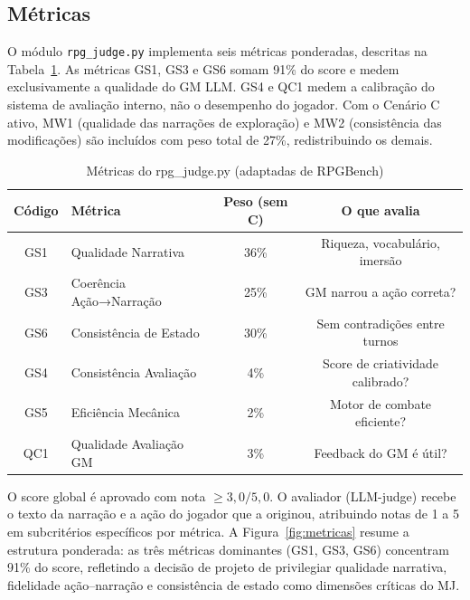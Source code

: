 \documentclass[12pt]{article}
\begin{document}
\subsection{Métricas}

O módulo \texttt{rpg\_judge.py} implementa seis métricas ponderadas, descritas na Tabela~\ref{tab:metricas}. As métricas GS1, GS3 e GS6 somam 91\% do score e medem exclusivamente a qualidade do GM LLM. GS4 e QC1 medem a calibração do sistema de avaliação interno, não o desempenho do jogador. Com o Cenário C ativo, MW1 (qualidade das narrações de exploração) e MW2 (consistência das modificações) são incluídos com peso total de 27\%, redistribuindo os demais.

\begin{table}[ht]
\centering
\caption{Métricas do rpg\_judge.py (adaptadas de RPGBench)}
\label{tab:metricas}
\begin{tabular}{clcc}
\toprule
\textbf{Código} & \textbf{Métrica} & \textbf{Peso (sem C)} & \textbf{O que avalia} \\
\midrule
GS1 & Qualidade Narrativa     & 36\% & Riqueza, vocabulário, imersão \\
GS3 & Coerência Ação→Narração & 25\% & GM narrou a ação correta? \\
GS6 & Consistência de Estado  & 30\% & Sem contradições entre turnos \\
GS4 & Consistência Avaliação  &  4\% & Score de criatividade calibrado? \\
GS5 & Eficiência Mecânica     &  2\% & Motor de combate eficiente? \\
QC1 & Qualidade Avaliação GM  &  3\% & Feedback do GM é útil? \\
\bottomrule
\end{tabular}
\end{table}

O score global é aprovado com nota $\geq 3{,}0/5{,}0$. O avaliador (LLM-judge) recebe o texto da narração e a ação do jogador que a originou, atribuindo notas de 1 a 5 em subcritérios específicos por métrica. A Figura~\ref{fig:metricas} resume a estrutura ponderada: as três métricas dominantes (GS1, GS3, GS6) concentram 91\% do score, refletindo a decisão de projeto de privilegiar qualidade narrativa, fidelidade ação--narração e consistência de estado como dimensões críticas do MJ.
\end{document}
